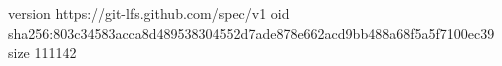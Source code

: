 version https://git-lfs.github.com/spec/v1
oid sha256:803c34583acca8d489538304552d7ade878e662acd9bb488a68f5a5f7100ec39
size 111142
